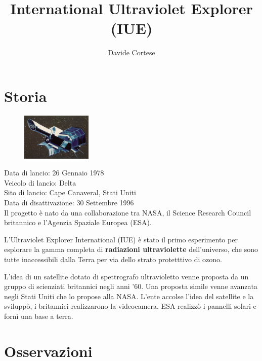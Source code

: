 \documentclass[12pt,a4paper]{article}
\begin{document}
\title{\vspace{-70pt}International Ultraviolet Explorer (IUE)}
\author{Davide Cortese}
\date{}
\maketitle
\pagestyle{empty}
\thispagestyle{empty}

\section*{Storia}
\label{storia}
\begin{figure}
  \vspace{-10pt}
  \begin{center}
    \includegraphics[width=0.30\textwidth]{satellite}
  \end{center}
  \vspace{-20pt}
\end{figure}
Data di lancio: 26 Gennaio 1978\\
Veicolo di lancio: Delta\\
Sito di lancio: Cape Canaveral, Stati Uniti\\
Data di disattivazione: 30 Settembre 1996\\

Il progetto è nato da una collaborazione tra NASA, il Science Research Council britannico e l'Agenzia Spaziale Europea (ESA).

L'Ultraviolet Explorer International (IUE) è stato il primo esperimento per esplorare la gamma completa di \textbf{radiazioni ultraviolette} dell'universo, che sono tutte inaccessibili dalla Terra per via dello strato protetttivo di ozono.

L'idea di un satellite dotato di spettrografo ultravioletto venne proposta da un gruppo di scienziati britannici negli anni '60. Una proposta simile venne avanzata negli Stati Uniti che lo propose alla NASA. L'ente accolse l'idea del satellite e la sviluppò, i britannici realizzarono la videocamera. ESA realizzò i pannelli solari e fornì una base a terra.

\section*{Osservazioni}
\label{osservazioni}
\end{document}
